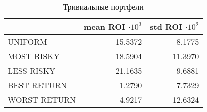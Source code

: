 \begin{table}[h]
\caption{Тривиальные портфели}
\label{tab:trivial_rois}
\begin{tabular}{lrr}
\toprule
 & mean ROI $\cdot 10^3$ & std ROI $\cdot 10^2$ \\
\midrule
UNIFORM & 15.5372 & 8.1775 \\
MOST RISKY & 18.5904 & 11.3970 \\
LESS RISKY & 21.1635 & 9.6881 \\
BEST RETURN & 1.2790 & 7.7329 \\
WORST RETURN & 4.9217 & 12.6324 \\
\bottomrule
\end{tabular}
\end{table}
